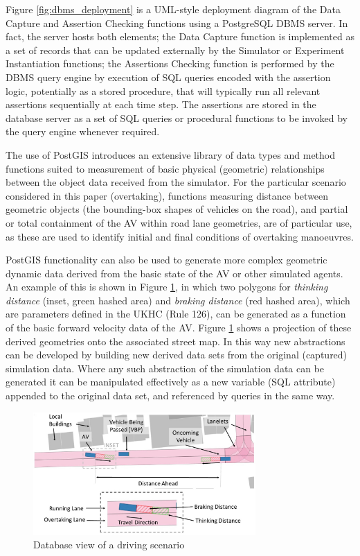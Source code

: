 Figure \ref{fig:dbms_deployment} is a UML-style deployment diagram of the Data Capture and Assertion Checking functions using a PostgreSQL DBMS server. In fact, the server hosts both elements; the Data Capture function is implemented as a set of records that can be updated externally by the Simulator or Experiment Instantiation functions; the Assertions Checking function is performed by the DBMS query engine by execution of SQL queries encoded with the assertion logic, potentially as a stored procedure, that will typically run all relevant assertions sequentially at each time step. The assertions are stored in the database server as a set of SQL queries or procedural functions to be invoked by the query engine whenever required.

The use of PostGIS introduces an extensive library of data types and method functions suited to measurement of basic physical (geometric) relationships between the  object data received from the simulator. For the particular scenario considered in this paper (overtaking), functions measuring distance between geometric objects (the bounding-box shapes of vehicles on the road), and partial or total containment of the AV within road lane geometries, are of particular use, as these are used to identify initial and final conditions of overtaking manoeuvres.

PostGIS functionality can also be used to generate more complex geometric dynamic data derived from the basic state of the AV or other simulated agents. An example of this is shown in Figure \ref{fig:assertion_database_annotated}, in which two polygons for \textit{thinking distance} (inset, green hashed area) and \textit{braking distance} (red hashed area), which are parameters defined in the UKHC (Rule 126), can be generated as a function of the basic forward velocity data of the AV. Figure \ref{fig:assertion_database_annotated} shows a projection of these derived geometries onto the associated street map. In this way new abstractions can be developed by building new derived data sets from the original (captured) simulation data. Where any such abstraction of the simulation data can be generated it can be manipulated effectively as a new variable (SQL attribute) appended to the original data set, and referenced by queries in the same way.

\begin{figure}[h!]
    \centering
    \includegraphics[width=8.5cm]{../other/figures/Slide5b.jpg}
    \caption{Database view of a driving scenario}
    \label{fig:assertion_database_annotated}
\end{figure}


